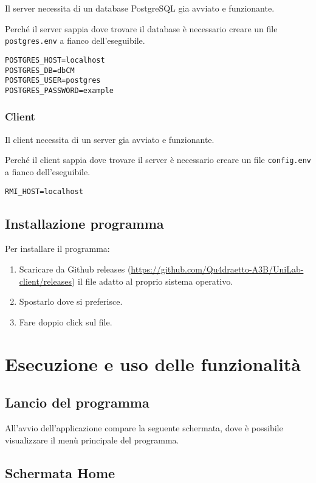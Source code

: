 Il server necessita di un database PostgreSQL gia avviato e funzionante.

Perché il server sappia dove trovare il database è necessario creare un file \texttt{postgres.env} a fianco dell'eseguibile.

\begin{lstlisting}[caption={Esempio \texttt{postgres.env}}]
POSTGRES_HOST=localhost
POSTGRES_DB=dbCM
POSTGRES_USER=postgres
POSTGRES_PASSWORD=example
\end{lstlisting}

\subsection{Client}

Il client necessita di un server gia avviato e funzionante.

Perché il client sappia dove trovare il server è necessario creare un file \texttt{config.env} a fianco dell'eseguibile.

\begin{lstlisting}[caption={Esempio \texttt{config.env}}]
RMI_HOST=localhost
\end{lstlisting}

\section{Installazione programma}

Per installare il programma:

\begin{enumerate}
	\item Scaricare da Github releases (\url{https://github.com/Qu4draetto-A3B/UniLab-client/releases}) il file adatto al proprio sistema operativo.
	\item Spostarlo dove si preferisce.
	\item Fare doppio click sul file.
\end{enumerate}

\chapter{Esecuzione e uso delle funzionalità}
\section{Lancio del programma}
All’avvio dell’applicazione compare la seguente schermata, dove è possibile visualizzare il menù principale del programma.
\section{Schermata Home}

